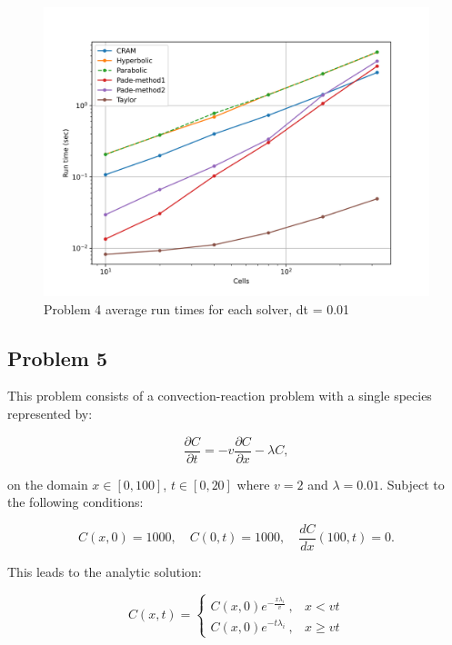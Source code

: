 \begin{figure}[p]
    \centering
    \includegraphics[width=6in]{images/chapter-5/progressionProblems/problem4/problem4Runtimes.png}
    \caption{Problem 4 average run times for each solver, dt = 0.01}
    \label{fig:problem4_runtimes}
\end{figure}

\clearpage

\subsection{Problem 5}
This problem consists of a convection-reaction problem with a single species represented by:

\begin{equation}
    \frac{\partial C}{\partial t} = -v\frac{\partial C}{\partial x} - \lambda C,
\end{equation}

\noindent on the domain $x \in [0,100]$, $t \in [0,20]$ where $v = 2$ and $\lambda = 0.01$. Subject to the following conditions:

\begin{equation}
    C(x, 0) = 1000, \quad C(0,t) = 1000, \quad \frac{dC}{dx}(100, t) = 0.
\end{equation}

\noindent This leads to the analytic solution:

\begin{equation}
C (x,t) = \begin{cases}
  C (x, 0) e^{-\frac{x \lambda _i}{v}}\ , & x < vt \\
  C (x, 0) e^{-t \lambda _i}\ , & x \ge vt
\end{cases}
\end{equation}

